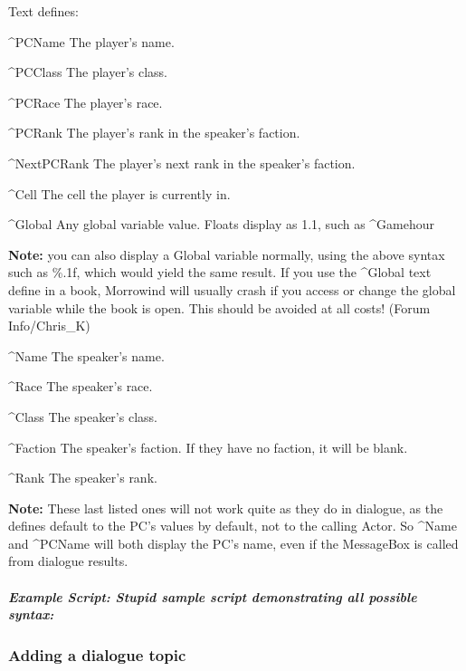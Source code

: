 Text defines:


\^{}PCName The player's name.

\^{}PCClass The player's class.

\^{}PCRace The player's race.

\^{}PCRank The player's rank in the speaker's faction.

\^{}NextPCRank The player's next rank in the speaker's faction.

\^{}Cell The cell the player is currently in.

\^{}Global Any global variable value. Floats display as 1.1, such as
\^{}Gamehour

\textbf{Note:} you can also display a Global variable normally, using
the above syntax such as \%.1f, which would yield the same result. If
you use the \^{}Global text define in a book, Morrowind will usually
crash if you access or change the global variable while the book is
open. This should be avoided at all costs! (Forum Info/Chris\_K)


\^{}Name The speaker's name.

\^{}Race The speaker's race.

\^{}Class The speaker's class.

\^{}Faction The speaker's faction. If they have no faction, it will be
blank.

\^{}Rank The speaker's rank.

\textbf{Note:} These last listed ones will not work quite as they do in
dialogue, as the defines default to the PC's values by default, not to
the calling Actor. So \^{}Name and \^{}PCName will both display the PC's
name, even if the MessageBox is called from dialogue results.

\hypertarget{example-script-stupid-sample-script-demonstrating-all-possible-syntax}{%
\subparagraph{Example Script: Stupid sample script demonstrating all
possible
syntax:}\label{example-script-stupid-sample-script-demonstrating-all-possible-syntax}}




\hypertarget{adding-a-dialogue-topic}{%
\subsubsection{Adding a dialogue topic}\label{adding-a-dialogue-topic}}

